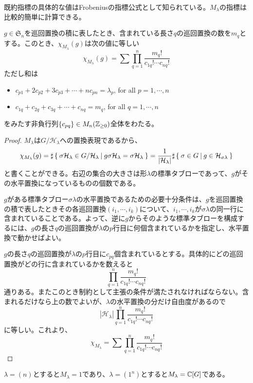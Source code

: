 \documentclass{ltjsreport}
\begin{document}
既約指標の具体的な値はFrobeniusの指標公式として知られている。$M_\lambda$の指標は比較的簡単に計算できる。

\begin{prop}\label{m_lambda_char_1}
  $g\in\mathfrak{S}_n$を巡回置換の積に表したとき、含まれている長さ$q$の巡回置換の数を$m_q$とする。このとき、$\chi_{M_\lambda}(g)$は次の値に等しい
  \[
  \chi_{M_\lambda}(g)=\sum\prod_{q=1}^n\frac{m_q!}{c_{1q}!\cdots c_{nq}!}  
  \]
  ただし和は
  \begin{itemize}
    \item $c_{p1}+2c_{p2}+3c_{p3}+\cdots+nc_{pn}=\lambda_p$, for all $p=1,\cdots,n$
    \item $c_{1q}+c_{2q}+c_{3q}+\cdots+c_{nq}=m_q$, for all $q=1,\cdots,n$
  \end{itemize}
  をみたす非負行列$\{c_{pq}\}\in M_n(\mathbb{Z}_{\geq 0})$全体をわたる。
\end{prop}

\begin{proof}
  $M_\lambda$は$G/\mathcal{H}_\lambda$への置換表現であるから、
  \[
  \chi_{M_\lambda}(g)
  =\sharp\left\{\:\sigma\mathcal{H}_{\lambda}\in G/\mathcal{H}_\lambda\:\middle|\:g\sigma\mathcal{H}_\lambda=\sigma\mathcal{H}_\lambda\:\right\}
  =\frac{1}{|\mathcal{H}_\lambda|}\sharp\left\{\:\sigma\in G\:\middle|\:g\in\mathcal{H}_{\sigma\lambda}\:\right\}
  \]
  と書くことができる。右辺の集合の大きさは形$\lambda$の標準タブローであって、$g$がその水平置換になっているものの個数である。
  
  $g$がある標準タブロー$\sigma\lambda$の水平置換であるための必要十分条件は、$g$を巡回置換の積で表したときその各巡回置換$(i_1,\cdots,i_k)$について、$i_1,\cdots,i_k$が$\sigma\lambda$の同一行に含まれていることである。よって、逆に$g$からそのような標準タブローを構成するには、$g$の長さ$q$の巡回置換が$\lambda$の$p$行目に何個含まれているかを指定し、水平置換で動かせばよい。

  $g$の長さ$q$の巡回置換が$\lambda$の$p$行目に$c_{pq}$個含まれているとする。具体的にどの巡回置換がどの行に含まれているかを数えると
  \[
    \prod_{q=1}^n\frac{m_q!}{c_{1q}!\cdots c_{nq}!}    
  \]
  通りある。またこのとき制約として主張の条件が満たされなければならない。含まれるだけなら上の数でよいが、$\lambda$の水平置換の分だけ自由度があるので
  \[
  |\mathcal{H}_\lambda|\prod_{q=1}^n\frac{m_q!}{c_{1q}!\cdots c_{nq}!}  
  \]
  に等しい。これより、
  \[
  \chi_{M_\lambda}=\sum\prod_{q=1}^n\frac{m_q!}{c_{1q}!\cdots c_{nq}!}   
  \]
\end{proof}

\begin{eg}
  $\lambda=(n)$とすると$M_\lambda=1$であり、$\lambda=(1^n)$とすると$M_\lambda=\mathbb{C}[G]$である。
\end{eg}
\end{document}

